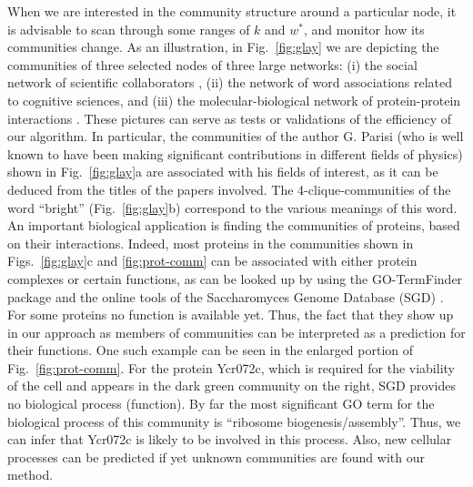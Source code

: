 \documentclass[11pt,a4paper]{article}
\begin{document}
When we are interested in the community structure around a
particular node, it is advisable to scan through some ranges of
$k$ and $w^*$, and monitor how its communities change.
As an illustration, in Fig.~\ref{fig:glay} we are depicting
the communities of three selected nodes of three large networks:
%
(i) the social network of scientific collaborators
\cite{cond-mat},
%
(ii) the network of word associations
\cite{nelson}
related to cognitive sciences, and
%
(iii) the molecular-biological network of protein-protein interactions
\cite{dip}.
%
These pictures can serve as tests or validations of the efficiency of
our algorithm.
%
In particular, the communities of the
author G. Parisi (who is well known to have been making significant
contributions in different fields of physics) shown in
Fig.~\ref{fig:glay}a are associated with his fields of interest, as it can
be deduced from the titles of the papers involved.
%
The 4-clique-communities of the word ``bright'' (Fig.~\ref{fig:glay}b)
correspond to the various meanings of this word. 
%
An important biological
application is finding the communities of proteins, based on their
interactions.
Indeed, most proteins in the communities shown in
Figs.~\ref{fig:glay}c and \ref{fig:prot-comm}
can be associated with either protein complexes or certain functions,
as can be looked up by using the GO-TermFinder package
\cite{termfinder}
and the online tools of the Saccharomyces Genome Database (SGD)
\cite{sgd}.
For some proteins no function is available
yet. Thus, the fact that they show up in our approach as members of
communities can be interpreted as a prediction for their functions.
{\corr
One such example can be seen in the enlarged portion of
Fig.~\ref{fig:prot-comm}.
For the protein Ycr072c, which is required for the viability of the
cell and appears in the dark green community on the right,
SGD provides no biological process (function).
By far the most
significant GO term for the biological process of this community is
``ribosome biogenesis/assembly''. Thus, we can infer that Ycr072c
is likely to be involved in this process.}
Also, new cellular processes can be predicted
if yet unknown communities are found with our method.
\end{document}

